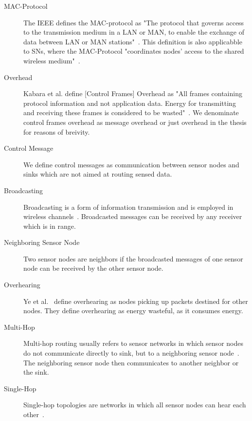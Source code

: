 \begin{description}
    \item[\ac{MAC}-Protocol]
        The \ac{IEEE} defines the \ac{MAC}-protocol as "The protocol that
        governs access to the transmission medium in a \ac{LAN} or \ac{MAN}, to
        enable the exchange of data between \ac{LAN} or \ac{MAN}
        stations"~\cite{ieee802}. This definition is also applicabble to
        \acp{SN}, where the \ac{MAC}-Protocol "coordinates nodes' access to the
        shared wireless medium"~\cite{kredo2007hybrid}.

    \item[Overhead]
        Kabara et al. define [Control Frames] Overhead as "All frames
        containing protocol information and not application data. Energy for
        transmitting and receiving these frames is considered to be
        wasted"~\cite{kabara2012mac}. We denominate control frames overhead as
        message overhead or just overhead in the thesis for reasons of
        breivity.

    \item[Control Message]
        We define control messages as communication between sensor nodes and
        sinks which are not aimed at routing sensed data.

    \item[Broadcasting]
        Broadcasting is a form of information transmission and is employed in
        wireless channels~\cite{lee2013energy}. Broadcasted messages can be
        received by any receiver which is in range.

    \item[Neighboring Sensor Node]
        Two sensor nodes are neighbors if the broadcasted messages of one
        sensor node can be received by the other sensor node. 

    \item[Overhearing]
        Ye et al.~\cite{ye2004medium} define overhearing as nodes picking up
        packets destined for other nodes. They define overhearing as energy
        wasteful, as it consumes energy.

    \item[Multi-Hop]
        Multi-hop routing usually refers to sensor networks in which sensor
        nodes do not communicate directly to sink, but to a neighboring sensor
        node~\cite{yaacoub2012multihop}. The neighboring sensor node then
        communicates to another neighbor or the sink.

    \item[Single-Hop]
        Single-hop topologies are networks in which all sensor nodes can hear
        each other~\cite{ye2004medium}.


\end{description}
